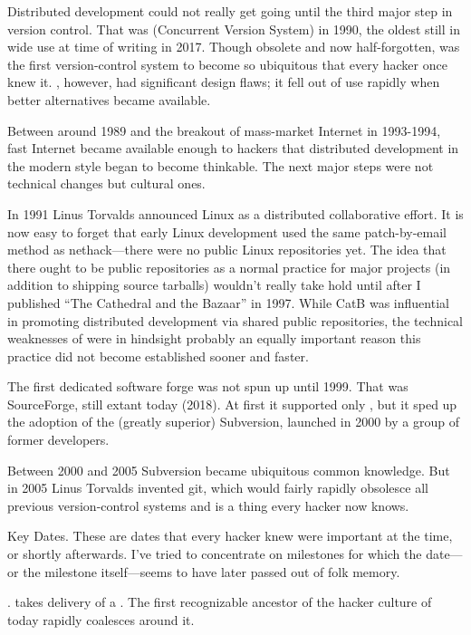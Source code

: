 Distributed development could not really get going until the third major step
in version control. That was  (Concurrent Version System) in 1990, the
oldest  still in wide use at time of writing in 2017. Though obsolete and
now half-forgotten,  was the first version-control system to become so
ubiquitous that every hacker once knew it. , however, had significant design
flaws; it fell out of use rapidly when better alternatives became
available.

Between around 1989 and the breakout of mass-market Internet in 1993-1994, fast
Internet became available enough to hackers that distributed development in the
modern style began to become thinkable. The next major steps were not technical
changes but cultural ones.

In 1991 Linus Torvalds announced Linux as a distributed collaborative effort.
It is now easy to forget that early Linux development used the same
patch-by-email method as nethack---there were no public Linux repositories yet.
The idea that there ought to be public repositories as a normal practice for
major projects (in addition to shipping source tarballs) wouldn't really take
hold until after I published ``The Cathedral and the Bazaar'' in 1997. While CatB
was influential in promoting distributed development via shared public
repositories, the technical weaknesses of  were in hindsight probably an
equally important reason this practice did not become established sooner and
faster.

The first dedicated software forge was not spun up until 1999. That was
SourceForge, still extant today (2018). At first it supported only , but it
sped up the adoption of the (greatly superior) Subversion, launched in 2000 by
a group of former  developers.

Between 2000 and 2005 Subversion became ubiquitous common knowledge. But in
2005 Linus Torvalds invented git, which would fairly rapidly obsolesce all
previous version-control systems and is a thing every hacker now knows.

\sect Key Dates.
These are dates that every hacker knew were important at the time, or shortly
afterwards. I've tried to concentrate on milestones for which the date---or the
milestone itself---seems to have later passed out of folk memory.

.
 takes delivery of a . The first recognizable ancestor of the hacker
culture of today rapidly coalesces around it.

